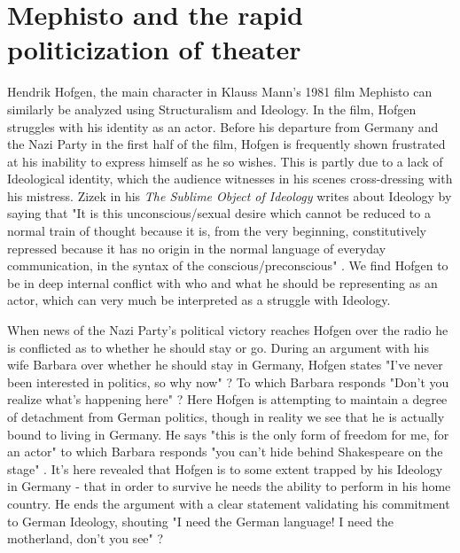 \documentclass[a4paper, 11pt]{article} %
\begin{document}

\section*{Mephisto and the rapid politicization of theater}

Hendrik Hofgen, the main character in Klauss Mann's 1981 film Mephisto can similarly be analyzed using Structuralism and Ideology.  In the film, Hofgen struggles with his identity as an actor.  Before his departure from Germany and the Nazi Party in the first half of the film, Hofgen is frequently shown frustrated at his inability to express himself as he so wishes.  This is partly due to a lack of Ideological identity, which the audience witnesses in his scenes cross-dressing with his mistress.  Zizek in his \textit{The Sublime Object of Ideology} writes about Ideology by saying that "It is this unconscious/sexual desire which cannot be reduced to a normal train of thought because it is, from the very beginning, constitutively repressed because it has no origin in the normal language of everyday communication, in the syntax of the conscious/preconscious" \cite{Zizek}.  We find Hofgen to be in deep internal conflict with who and what he should be representing as an actor, which can very much be interpreted as a struggle with Ideology.  

When news of the Nazi Party's political victory reaches Hofgen over the radio he is conflicted as to whether he should stay or go.  During an argument with his wife Barbara over whether he should stay in Germany, Hofgen states "I've never been interested in politics, so why now" \cite{MephistoFilm}?  To which Barbara responds "Don't you realize what's happening here" \cite{MephistoFilm}?  Here Hofgen is attempting to maintain a degree of detachment from German politics, though in reality we see that he is actually bound to living in Germany.  He says "this is the only form of freedom for me, for an actor" \cite{MephistoFilm} to which Barbara responds "you can't hide behind Shakespeare on the stage" \cite{MephistoFilm}.  It's here revealed that Hofgen is to some extent trapped by his Ideology in Germany - that in order to survive he needs the ability to perform in his home country.  He ends the argument with a clear statement validating his commitment to German Ideology, shouting "I need the German language!  I need the motherland, don't you see" \cite{MephistoFilm}?  

\end{document}
